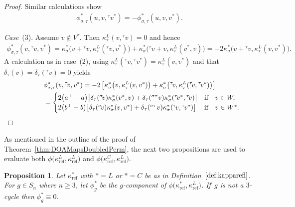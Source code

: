 \documentclass[pdftex]{sigma}
\numberwithin{equation}{section}
\newtheorem{Proposition}[Theorem]{Proposition}
 { \theoremstyle{definition}
\newtheorem{Definition}[Theorem]{Definition}
\newtheorem{Remark}[Theorem]{Remark}
\newtheorem{case}{Case}}
\newcommand{\actby}[1]{{}^{#1}}
\newcommand{\actbylessspace}[1]{{}^{#1}\!}
\DeclareMathOperator{\refl}{ref}
\begin{document}
\begin{proof}
Similar calculations show
\begin{gather*}
\phi^*_{\sigma,\tau}(u,v,\actbylessspace{\tau}v^*)=-\phi^*_{\sigma,\tau}(u,v,v^*).
\end{gather*}
		
\textit{Case}~(3). Assume $v \notin V^{\tau}$.
Then $\kappa^L_{\tau}(v,\actbylessspace{\tau}v)=0$ and hence
\begin{gather*}
\phi^*_{\sigma,\tau}(v,\actbylessspace{\tau}v,v^*) =\kappa^*_{\sigma}\big(v+\actbylessspace{\tau}v,\kappa^L_{\tau} (\actbylessspace{\tau}v,v^*)\big)+\kappa^*_{\sigma}\big(\actbylessspace{\tau}v+v,\kappa^L_{\tau}(v^*,v)\big)
=-2\kappa^*_{\sigma}\big(v+\actbylessspace{\tau}v,\kappa^L_{\tau}(v,v^*)\big).
\end{gather*}
A calculation as in case~(2), using
$\kappa^L_\tau(\actbylessspace{\tau}v,\actbylessspace{\tau}v^*)=\kappa^L_{\tau}(v,v^*)$
and that $\delta_{\tau}(v)=\delta_{\tau}(\actbylessspace{\tau}v)=0$ yields
\begin{gather*}
\phi^*_{\sigma,\tau}(v,\actbylessspace{\tau}v,v^*)
=-2\left[\kappa^*_{\sigma}\big(v,\kappa^L_{\tau}(v,v^*)\big) +\kappa^*_{\sigma}\big(\actbylessspace{\tau}v,\kappa^L_{\tau} (\actbylessspace{\tau}v,\actbylessspace{\tau}v^*)\big)\right]
\\ \hphantom{\phi^*_{\sigma,\tau}(v,\actbylessspace{\tau}v,v^*) }
=\begin{cases}
2\big(a^\perp-a\big)\big[\delta_{\tau}(\actbylessspace{\sigma}v)\kappa^*_{\sigma}(v^*,v) +\delta_{\tau}(\actby{\sigma\tau}v)\kappa^*_{\sigma}(\actbylessspace{\tau}v^*,\actbylessspace{\tau}v) \big] & \text{if}\quad v \in W,
\\
2\big(b^\perp-b\big)\big[\delta_{\tau}(\actbylessspace{\sigma}v)\kappa^*_{\sigma}(v,v^*) +\delta_{\tau}(\actby{\sigma\tau}v)\kappa^*_{\sigma}(\actbylessspace{\tau}v,\actbylessspace{\tau}v^*) \big] & \text{if}\quad v \in W^*.
\end{cases}	
\tag*{\qed}
\end{gather*}
\renewcommand{\qed}{}
\end{proof}

As mentioned in the outline of the proof of Theorem~\ref{thm:DOAMapsDoubledPerm}, the next two propositions are used to evaluate both $\phi\big(\kappa^L_{\refl},\kappa^L_{\refl}\big)$ and $\phi\big(\kappa^C_{\refl},\kappa^L_{\refl}\big)$.

\begin{Proposition}\label{prop:zerocases}
	Let $\kappa^{*}_{\refl}$ with $*=L$ or $*=C$ be as in Definition~$\ref{def:kapparefl}$.
	For $g \in S_n$ where $n \geq 3$, let $\phi^{*}_g$ be the $g$-component of $\phi\big(\kappa^{*}_{\refl},\kappa^L_{\refl}\big)$. If~$g$ is not a $3$-cycle then $\phi^{*}_g \equiv 0$.
\end{Proposition}
\end{document}
